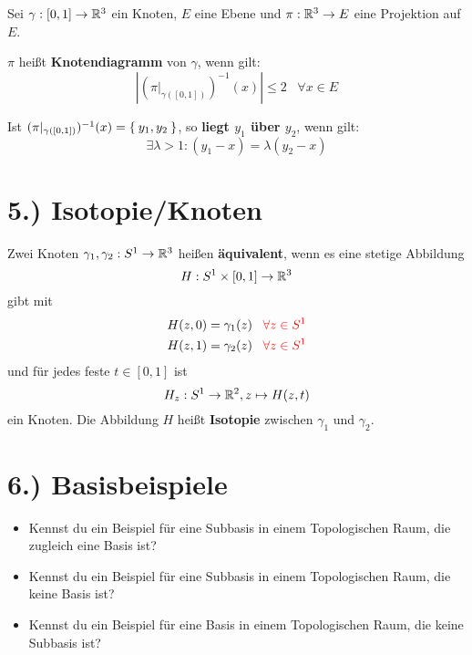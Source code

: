 \documentclass[a5paper,oneside]{scrbook}
\begin{document}

\begin{definition}%
    Sei $\gamma: [0,1] \rightarrow \mathbb{R}^3$ ein Knoten, $E$ eine Ebene und 
    $\pi: \mathbb{R}^3 \rightarrow E$ eine Projektion auf $E$.

    $\pi$ heißt \textbf{Knotendiagramm} von $\gamma$, wenn gilt:
    \[\left | \left (\pi|_{\gamma([0,1])} \right )^{-1}(x) \right | \leq 2 \;\;\; \forall x \in E\]

    Ist $(\pi|_{\gamma([0,1])})^{-1}(x) = \Set{y_1, y_2}$, so \textbf{liegt $y_1$ über $y_2$},
    wenn gilt:
    \[\exists \lambda > 1: (y_1-x) = \lambda (y_2 - x)\]
\end{definition}


\section*{5.) Isotopie/Knoten}
\begin{definition}
    Zwei Knoten $\gamma_1, \gamma_2: S^1 \rightarrow \mathbb{R}^3$ heißen
    \textbf{äquivalent}, wenn es eine stetige Abbildung
    \[H: S^1 \times [0,1] \rightarrow \mathbb{R}^3\]
    gibt mit 
    \begin{align*}
        H(z,0) &= \gamma_1(z) {\;\;\;\color{red} \forall z \in S^1}\\
        H(z,1) &= \gamma_2(z) {\;\;\;\color{red} \forall z \in S^1}
    \end{align*}
    und für jedes
    feste $t \in [0,1]$ ist 
    \[H_z: S^1 \rightarrow \mathbb{R}^2, z \mapsto H(z,t)\]
    ein Knoten. Die Abbildung $H$ heißt \textbf{Isotopie} zwischen
    $\gamma_1$ und $\gamma_2$.
\end{definition}


\section*{6.) Basisbeispiele}
\begin{itemize}
    \item Kennst du ein Beispiel für eine Subbasis in einem Topologischen Raum,
die zugleich eine Basis ist?
    \item Kennst du ein Beispiel für eine Subbasis in einem Topologischen Raum,
die keine Basis ist?
    \item Kennst du ein Beispiel für eine Basis in einem Topologischen Raum,
die keine Subbasis ist?
\end{itemize}
\end{document}

